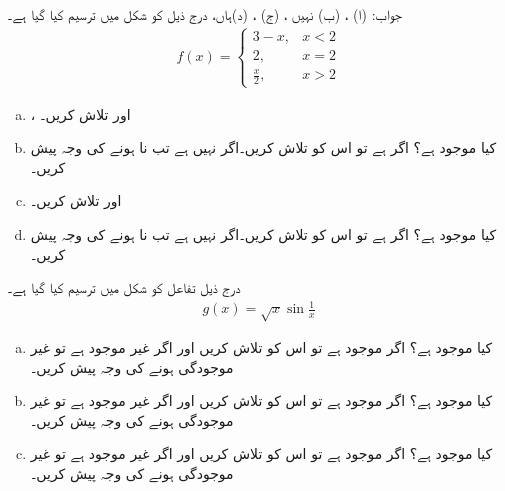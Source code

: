 جواب:\quad
(ا) ، (ب) نہیں ، (ج) ، (د)ہاں، 
درج ذیل کو شکل  میں ترسیم کیا گیا ہے۔
\begin{align*}
f(x)=\begin{cases}
3-x,&x<2\\
2,&x=2\\
\frac{x}{2},&x>2
\end{cases}
\end{align*}
%
\begin{enumerate}[a.]
\item
{}،  اور  تلاش کریں۔
\item
کیا  موجود ہے؟ اگر ہے تو اس کو تلاش کریں۔اگر نہیں ہے تب نا ہونے کی وجہ پیش کریں۔
\item
{} اور  تلاش کریں۔
\item
کیا  موجود ہے؟ اگر ہے تو اس کو تلاش کریں۔اگر نہیں ہے تب نا ہونے کی وجہ پیش کریں۔
\end{enumerate}
درج ذیل تفاعل کو شکل  میں ترسیم کیا گیا ہے۔
\begin{align*}
g(x)=\sqrt{x}\sin\frac{1}{x}
\end{align*}
%
\begin{enumerate}[a.]
\item
کیا  موجود ہے؟ اگر موجود ہے تو اس کو تلاش کریں اور اگر غیر موجود ہے تو غیر موجودگی ہونے کی وجہ پیش کریں۔
\item
کیا  موجود ہے؟ اگر موجود ہے تو اس کو تلاش کریں اور اگر غیر موجود ہے تو غیر موجودگی ہونے کی وجہ پیش کریں۔
\item
کیا  موجود ہے؟ اگر موجود ہے تو اس کو تلاش کریں اور اگر غیر موجود ہے تو غیر موجودگی ہونے کی وجہ پیش کریں۔
\end{enumerate}
%
